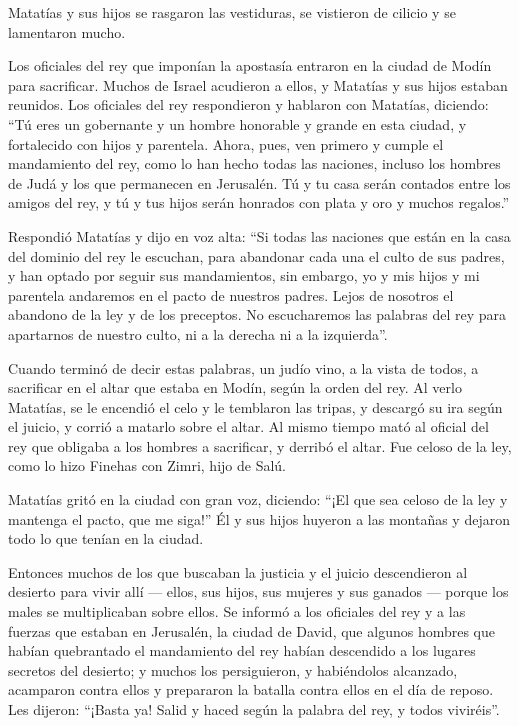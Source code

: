  Matatías y sus hijos se rasgaron las vestiduras, se
vistieron de cilicio y se lamentaron mucho.

 Los oficiales del rey que imponían la apostasía entraron
en la ciudad de Modín para sacrificar.  Muchos de Israel
acudieron a ellos, y Matatías y sus hijos estaban reunidos.
 Los oficiales del rey respondieron y hablaron con
Matatías, diciendo: ``Tú eres un gobernante y un hombre honorable y
grande en esta ciudad, y fortalecido con hijos y parentela.
 Ahora, pues, ven primero y cumple el mandamiento del
rey, como lo han hecho todas las naciones, incluso los hombres de Judá y
los que permanecen en Jerusalén. Tú y tu casa serán contados entre los
amigos del rey, y tú y tus hijos serán honrados con plata y oro y muchos
regalos.''

 Respondió Matatías y dijo en voz alta: ``Si todas las
naciones que están en la casa del dominio del rey le escuchan, para
abandonar cada una el culto de sus padres, y han optado por seguir sus
mandamientos,  sin embargo, yo y mis hijos y mi parentela
andaremos en el pacto de nuestros padres.  Lejos de
nosotros el abandono de la ley y de los preceptos.  No
escucharemos las palabras del rey para apartarnos de nuestro culto, ni a
la derecha ni a la izquierda''.

 Cuando terminó de decir estas palabras, un judío vino, a
la vista de todos, a sacrificar en el altar que estaba en Modín, según
la orden del rey.  Al verlo Matatías, se le encendió el
celo y le temblaron las tripas, y descargó su ira según el juicio, y
corrió a matarlo sobre el altar.  Al mismo tiempo mató al
oficial del rey que obligaba a los hombres a sacrificar, y derribó el
altar.  Fue celoso de la ley, como lo hizo Finehas con
Zimri, hijo de Salú.

 Matatías gritó en la ciudad con gran voz, diciendo:
``¡El que sea celoso de la ley y mantenga el pacto, que me siga!''
 Él y sus hijos huyeron a las montañas y dejaron todo lo
que tenían en la ciudad.

 Entonces muchos de los que buscaban la justicia y el
juicio descendieron al desierto para vivir allí --- 
ellos, sus hijos, sus mujeres y sus ganados --- porque los males se
multiplicaban sobre ellos.  Se informó a los oficiales
del rey y a las fuerzas que estaban en Jerusalén, la ciudad de David,
que algunos hombres que habían quebrantado el mandamiento del rey habían
descendido a los lugares secretos del desierto;  y muchos
los persiguieron, y habiéndolos alcanzado, acamparon contra ellos y
prepararon la batalla contra ellos en el día de reposo. 
Les dijeron: ``¡Basta ya! Salid y haced según la palabra del rey, y
todos viviréis''.

